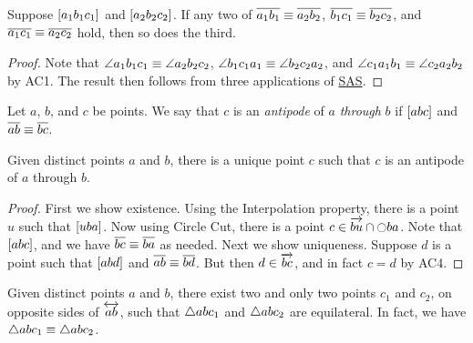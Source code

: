\begin{cor}\label{cor:segment-addition}
Suppose \([ a_1 b_1 c_1 ]\) and \([ a_2 b_2 c_2 ]\).
If any two of \(\overline{a_1b_1} \equiv \overline{a_2b_2}\), \(\overline{b_1c_1} \equiv \overline{b_2c_2}\), and \(\overline{a_1c_1} \equiv \overline{a_2c_2}\) hold, then so does the third.
\end{cor}

\begin{proof}
Note that \(\angle{a_1b_1c_1} \equiv \angle{a_2b_2c_2}\), \(\angle{b_1c_1a_1} \equiv \angle{b_2c_2a_2}\), and \(\angle{c_1a_1b_1} \equiv \angle{c_2a_2b_2}\) by AC1.
The result then follows from three applications of \hyperref[prop:sas-theorem]{SAS}.
\end{proof}

\begin{dfn}[Antipode]
Let \(a\), \(b\), and \(c\) be points.
We say that \(c\) is an \emph{antipode} of \(a\) \emph{through} \(b\) if \([ a b c ]\) and \(\overline{ab} \equiv \overline{bc}\).
\end{dfn}

\begin{construct}[Antipode]\label{construct:antipode}
Given distinct points \(a\) and \(b\), there is a unique point \(c\) such that \(c\) is an antipode of \(a\) through \(b\).
\end{construct}

\begin{proof}
First we show existence.
Using the Interpolation property, there is a point \(u\) such that \([ u b a ]\).
Now using Circle Cut, there is a point \(c \in \overrightarrow{bu} \cap \ocircle{ba}\).
Note that \([ a b c ]\), and we have \(\overline{bc} \equiv \overline{ba}\) as needed.
Next we show uniqueness.
Suppose \(d\) is a point such that \([ a b d ]\) and \(\overline{ab} \equiv \overline{bd}\).
But then \(d \in \overrightarrow{bc}\), and in fact \(c = d\) by AC4.
\end{proof}

\begin{construct}\label{construct:equilateral-points}
Given distinct points \(a\) and \(b\), there exist two and only two points \(c_1\) and \(c_2\), on opposite sides of \(\overleftrightarrow{ab}\), such that \(\bigtriangleup{abc_1}\) and \(\bigtriangleup{abc_2}\) are equilateral.
In fact, we have \(\bigtriangleup{abc_1} \equiv \bigtriangleup{abc_2}\).
\end{construct}


